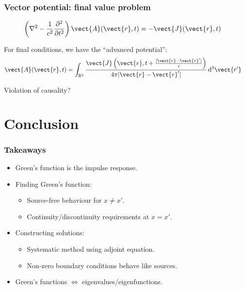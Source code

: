 \documentclass[12 pt, compress, handout, intlimits]{beamer}
\renewcommand{\d}{\operatorname{d}\!}
\begin{document}
\note{}

\begin{frame}[fragile]
    \frametitle{Vector potential: final value problem}
    
    \begin{align*}
        \left( \nabla^2 - \frac{1}{c^2} \frac{\partial^2}{\partial t^2} \right) \vect{A}(\vect{r}, t) &= - \vect{J}(\vect{r}, t)
    \end{align*}
    
    For final conditions, we have the ``advanced potential'':
    \begin{align*}
        \vect{A}(\vect{r}, t) &= \int_{\mathbb{R}^3} \frac{\vect{J}\left(\vect{r}, t + \frac{|\vect{r} - \vect{r}'|}{c}\right)}{4 \pi |\vect{r} - \vect{r}'|} \d^3 \vect{r'}
    \end{align*}

    Violation of causality?
    
\end{frame}

\note{}
\fi

\section{Conclusion}
\label{sec:conclusion}

\note{}

\begin{frame}[fragile]
    \frametitle{Takeaways}
    
    \begin{itemize}
    \item
        Green's function is the impulse response.
    \item
        Finding Green's function:
        \begin{itemize}
        \item
            Source-free behaviour for $ x \neq x' $.
        \item
            Continuity/discontinuity requirements at $ x = x' $.
        \end{itemize}
    \item
        Constructing solutions:
        \begin{itemize}
        \item
            Systematic method using adjoint equation.
        \item
            Non-zero boundary conditions behave like sources.
        \end{itemize}
    \item
        Green's functions $ \Longleftrightarrow $ eigenvalues/eigenfunctions.
    \end{itemize}
    

\end{frame}
\end{document}
